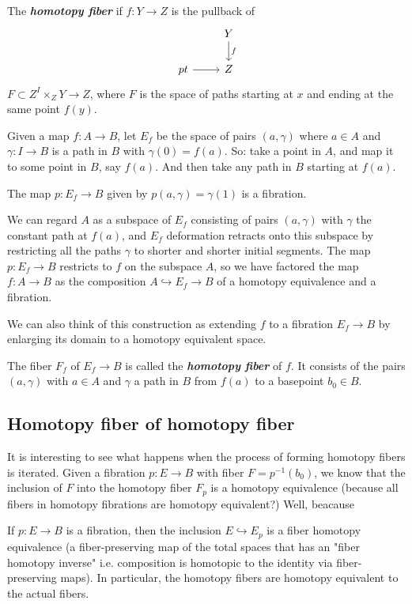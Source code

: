 \begin{defn}
	The \textbf{\textit{homotopy fiber}} if $f:Y\to Z$ is the pullback of
		\[\begin{tikzcd}
			&Y\arrow[d,"f"]\\
			pt\arrow[r]&Z
		\end{tikzcd}\]
		$F\subset Z^I\times_ZY\to Z$, where $F$ is the space of paths starting at $x$ and ending at the same point $f(y)$.
\end{defn}

\begin{defn}
	Given a map $f:A\to B$, let $E_f$ be the space of pairs $(a,\gamma)$ where $a\in A$ and $\gamma:I\to B$ is a path in $B$ with $\gamma(0)=f(a)$. {\color{blue}So: take a point in $A$, and map it to some point in $B$, say $f(a)$. And then take any path in $B$ starting at $f (a)$.}
\begin{prop}
	The map $p:E_f\to B$ given by $p(a,\gamma)=\gamma(1)$ is a fibration.
\end{prop}
We can regard $A$ as a subspace of $E_{f}$ consisting of pairs $(a,\gamma)$ with $\gamma$ the constant path at $f(a)$, and $E_f$ deformation retracts onto this subspace by restricting all the paths $\gamma$ to shorter and shorter initial segments. The map $p:E_f\to B$ restricts to $f$ on the subspace $A$, so we have factored the map $f:A\to B$ as the composition $A\hookrightarrow E_f\to B$ of a homotopy equivalence and a fibration.

We can also think of this construction as extending $f$ to a fibration $E_f\to B$ by enlarging its domain to a homotopy equivalent space.

The fiber $F_f$ of $E_f\to B$ is called the \textit{\textbf{homotopy fiber}} of $f$. It consists of the pairs $(a,\gamma)$ with $a\in A$ and $\gamma$ a path in $B$ from $f(a)$ to a basepoint $b_0\in B$.
\end{defn}

\subsection*{Homotopy fiber of homotopy fiber}

It is interesting to see what happens when the process of forming homotopy fibers is iterated. Given a fibration $p:E\to B$ with fiber $F=p^{-1} (b_0)$, we know that the inclusion of $F$ into the homotopy fiber $F_{p}$ is a homotopy equivalence {\color{blue}(because all fibers in homotopy fibrations are homotopy equivalent?)} Well, beacause
\begin{prop}[4.66]
	If $p:E\to B$ is a fibration, then the inclusion $E\hookrightarrow E_p$ is a fiber homotopy equivalence (a fiber-preserving map of the total spaces that has an "fiber homotopy inverse" i.e. composition is homotopic to the identity via fiber-preserving maps). In particular, the homotopy fibers are homotopy equivalent to the actual fibers.
\end{prop}

